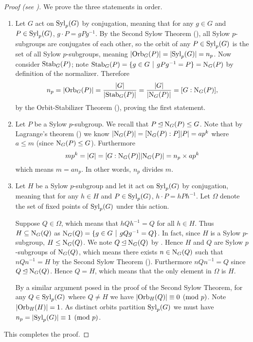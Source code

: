 \begin{proof}[Proof (see \cite{wielandt_1959})]
    We prove the three statements in order.
    \begin{enumerate}
        \item Let $G$ act on $\mathrm{Syl}_{p}(G)$ by conjugation, meaning that for any $g \in G$ and $P \in \mathrm{Syl}_{p}(G)$, $g\cdot P = gPg^{-1}$. By the Second Sylow Theorem (), all Sylow $p$-subgroups are conjugates of each other, so the orbit of any $P \in \mathrm{Syl}_{p}(G)$ is the set of all Sylow $p$-subgroups, meaning $|\mathrm{Orb}_{G}(P)| = |\mathrm{Syl}_{p}(G)| = n_p$. Now consider $\mathrm{Stab}_{G}(P)$; note $\Stab{G}{P} = \{g \in G \vert gPg^{-1} = P\} = \N{G}{P}$ by definition of the normalizer. Therefore
        \[
            n_p = |\mathrm{Orb}_{G}(P)| = \frac{|G|}{|\mathrm{Stab}_{G}(P)|} = \frac{|G|}{|\mathrm{N}_{G}(P)|} = [G : \mathrm{N}_{G}(P)],
        \]
        by the Orbit-Stabilizer Theorem (), proving the first statement.

        \item Let $P$ be a Sylow $p$-subgroup. We recall that $P \unlhd \mathrm{N}_{G}(P) \leq G$. Note that by Lagrange's theorem () we know $|\mathrm{N}_{G}(P)| = [\mathrm{N}_{G}(P) : P]|P| = ap^k$ where $a \leq m$ (since $\mathrm{N}_{G}(P) \leq G$). Furthermore
        \[
            mp^k = |G| = [G: \mathrm{N}_{G}(P)]|\mathrm{N}_{G}(P)| = n_p \times ap^k
        \]
        which means $m = an_p$. In other words, $n_p$ divides $m$.

        \item Let $H$ be a Sylow $p$-subgroup and let it act on $\mathrm{Syl}_{p}(G)$ by conjugation, meaning that for any $h \in H$ and $P \in \mathrm{Syl}_{p}(G)$, $h \cdot P = hPh^{-1}$. Let $\Omega$ denote the set of fixed points of $\mathrm{Syl}_{p}(G)$ under this action.

        Suppose $Q \in \Omega$, which means that $hQh^{-1} = Q$ for all $h \in H$. Thus $H \subseteq \mathrm{N}_{G}(Q)$ as $\N{G}{Q} = \{g \in G \vert gQg^{-1} = Q\}$. In fact, since $H$ is a Sylow $p$-subgroup, $H \leq \mathrm{N}_{G}(Q)$. We note $Q \unlhd \mathrm{N}_{G}(Q)$ by . Hence $H$ and $Q$ are Sylow $p$-subgroups of $\mathrm{N}_{G}(Q)$, which means there exists $n \in \mathrm{N}_{G}(Q)$ such that $nQn^{-1} = H$ by the Second Sylow Theorem (). Furthermore $nQn^{-1} = Q$ since $Q \unlhd \mathrm{N}_{G}(Q)$. Hence $Q = H$, which means that the only element in $\Omega$ is $H$.

        By a similar argument posed in the proof of the Second Sylow Theorem, for any $Q \in \mathrm{Syl}_{p}(G)$ where $Q \neq H$ we have $|\mathrm{Orb}_{H}(Q)| \equiv 0 \pmod p$. Note $|\mathrm{Orb}_{H}(H)| = 1$. As distinct orbits partition $\mathrm{Syl}_{p}(G)$ we must have $n_p = |\mathrm{Syl}_{p}(G)| \equiv 1 \pmod p$.
    \end{enumerate}
    This completes the proof.
\end{proof}

